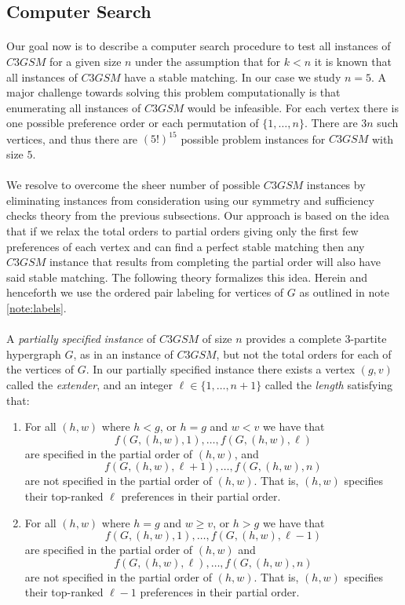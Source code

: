 \subsection{Computer Search}\label{sec:computersearch}
\paragraph{}
Our goal now is to describe a computer search procedure to test all instances of $C3GSM$ for a given size $n$ under the assumption that for $k<n$ it is known that all instances of $C3GSM$ have a stable matching. In our case we study $n=5$. A major challenge towards solving this problem computationally is that enumerating all instances of $C3GSM$ would be infeasible. For each vertex there is one possible preference order or each permutation of $\{1,\dots,n\}$. There are $3n$ such vertices, and thus there are $(5!)^{15}$ possible problem instances for $C3GSM$ with size $5$. 
\paragraph{}
We resolve to overcome the sheer number of possible $C3GSM$ instances by eliminating instances from consideration using our symmetry and sufficiency checks theory from the previous subsections. Our approach is based on the idea that if we relax the total orders to partial orders giving only the first few preferences of each vertex and can find a perfect stable matching then any $C3GSM$ instance that results from completing the partial order will also have said stable matching. The following theory formalizes this idea. Herein and henceforth we use the ordered pair labeling for vertices of $G$ as outlined in note \ref{note:labels}.

\paragraph{}A {\it partially} {\it specified} {\it instance} of $C3GSM$ of size $n$ provides a complete $3$-partite hypergraph $G$, as in an instance of $C3GSM$, but not the total orders for each of the vertices of $G$. In our partially specified instance there exists a vertex $(g,v)$ called the {\it extender}, and an integer $\ell \in \{1, \dots, n+1\}$ called the {\it length} satisfying that:
\begin{enumerate}
\item For all $(h,w)$ where $h < g$, or $h=g$ and $w < v$ we have that 
$$f(G, (h,w), 1), \dots, f(G,(h,w),\ell)$$
are specified in the partial order of $(h,w)$, and 
$$f(G, (h,w), \ell+1), \dots, f(G, (h,w), n)$$
are not specified in the partial order of $(h,w)$. That is, $(h,w)$ specifies their top-ranked $\ell$ preferences in their partial order.
\item For all $(h,w)$ where $h = g$ and $w \geq v$, or $h > g$ we have that
$$f(G, (h,w), 1), \dots, f(G, (h,w), \ell -1)$$
are specified in the partial order of $(h,w)$ and
$$f(G, (h,w), \ell), \dots, f(G,(h,w), n)$$
are not specified in the partial order of $(h,w)$. That is, $(h,w)$ specifies their top-ranked $\ell-1$ preferences in their partial order.
\end{enumerate}

